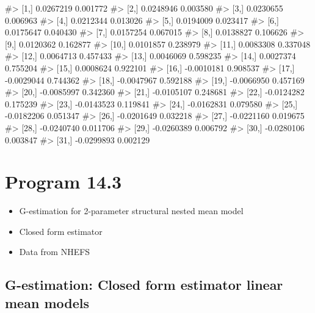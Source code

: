 \documentclass[
  10pt,
  a4paper,
]{book}
\newenvironment{Shaded}{\begin{snugshade}}{\end{snugshade}}
\newcommand{\CommentTok}[1]{\textcolor[rgb]{0.37,0.37,0.37}{#1}}
\providecommand{\tightlist}{%
  \setlength{\itemsep}{0pt}\setlength{\parskip}{0pt}}
\begin{document}
\begin{Shaded}
\begin{Highlighting}[]
\CommentTok{\#\textgreater{}  [1,]  0.0267219 0.001772}
\CommentTok{\#\textgreater{}  [2,]  0.0248946 0.003580}
\CommentTok{\#\textgreater{}  [3,]  0.0230655 0.006963}
\CommentTok{\#\textgreater{}  [4,]  0.0212344 0.013026}
\CommentTok{\#\textgreater{}  [5,]  0.0194009 0.023417}
\CommentTok{\#\textgreater{}  [6,]  0.0175647 0.040430}
\CommentTok{\#\textgreater{}  [7,]  0.0157254 0.067015}
\CommentTok{\#\textgreater{}  [8,]  0.0138827 0.106626}
\CommentTok{\#\textgreater{}  [9,]  0.0120362 0.162877}
\CommentTok{\#\textgreater{} [10,]  0.0101857 0.238979}
\CommentTok{\#\textgreater{} [11,]  0.0083308 0.337048}
\CommentTok{\#\textgreater{} [12,]  0.0064713 0.457433}
\CommentTok{\#\textgreater{} [13,]  0.0046069 0.598235}
\CommentTok{\#\textgreater{} [14,]  0.0027374 0.755204}
\CommentTok{\#\textgreater{} [15,]  0.0008624 0.922101}
\CommentTok{\#\textgreater{} [16,] {-}0.0010181 0.908537}
\CommentTok{\#\textgreater{} [17,] {-}0.0029044 0.744362}
\CommentTok{\#\textgreater{} [18,] {-}0.0047967 0.592188}
\CommentTok{\#\textgreater{} [19,] {-}0.0066950 0.457169}
\CommentTok{\#\textgreater{} [20,] {-}0.0085997 0.342360}
\CommentTok{\#\textgreater{} [21,] {-}0.0105107 0.248681}
\CommentTok{\#\textgreater{} [22,] {-}0.0124282 0.175239}
\CommentTok{\#\textgreater{} [23,] {-}0.0143523 0.119841}
\CommentTok{\#\textgreater{} [24,] {-}0.0162831 0.079580}
\CommentTok{\#\textgreater{} [25,] {-}0.0182206 0.051347}
\CommentTok{\#\textgreater{} [26,] {-}0.0201649 0.032218}
\CommentTok{\#\textgreater{} [27,] {-}0.0221160 0.019675}
\CommentTok{\#\textgreater{} [28,] {-}0.0240740 0.011706}
\CommentTok{\#\textgreater{} [29,] {-}0.0260389 0.006792}
\CommentTok{\#\textgreater{} [30,] {-}0.0280106 0.003847}
\CommentTok{\#\textgreater{} [31,] {-}0.0299893 0.002129}
\end{Highlighting}
\end{Shaded}

\section{Program 14.3}\label{program-14.3}

\begin{itemize}
\tightlist
\item
  G-estimation for 2-parameter structural nested mean model
\item
  Closed form estimator
\item
  Data from NHEFS
\end{itemize}

\subsection{G-estimation: Closed form estimator linear mean models}\label{g-estimation-closed-form-estimator-linear-mean-models}
\end{document}
